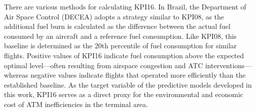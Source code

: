 There are various methods for calculating KPI16. In Brazil, the Department of Air Space Control (DECEA) adopts a strategy similar to KPI08, as the additional fuel burn is calculated as the difference between the actual fuel consumed by an aircraft and a reference fuel consumption. Like KPI08, this baseline is determined as the 20th percentile of fuel consumption for similar flights. Positive values of KPI16 indicate fuel consumption above the expected optimal level—often resulting from airspace congestion and ATC interventions—whereas negative values indicate flights that operated more efficiently than the established baseline. As the target variable of the predictive models developed in this work, KPI16 serves as a direct proxy for the environmental and economic cost of ATM inefficiencies in the terminal area.
